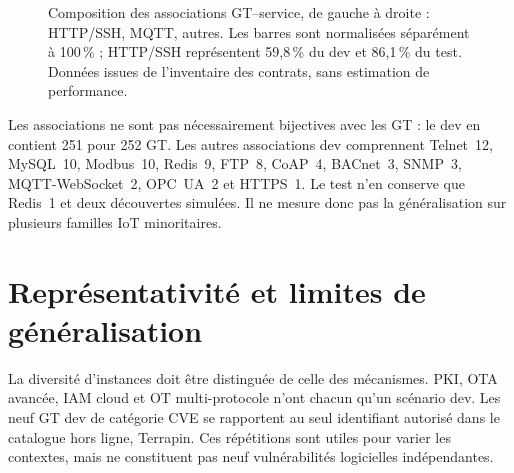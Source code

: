 \documentclass[11pt,a4paper]{article}
\begin{document}
\begin{figure}[htbp]
\centering
{}
\caption{Composition des associations GT--service, de gauche à droite : HTTP/SSH, MQTT, autres. Les barres sont normalisées séparément à 100\,\% ; HTTP/SSH représentent 59,8\,\% du dev et 86,1\,\% du test. Données issues de l'inventaire des contrats, sans estimation de performance.}
\label{fig:services}
\end{figure}

Les associations ne sont pas nécessairement bijectives avec les GT : le dev en contient 251 pour 252 GT. Les autres associations dev comprennent Telnet~12, MySQL~10, Modbus~10, Redis~9, FTP~8, CoAP~4, BACnet~3, SNMP~3, MQTT-WebSocket~2, OPC~UA~2 et HTTPS~1. Le test n'en conserve que Redis~1 et deux découvertes simulées. Il ne mesure donc pas la généralisation sur plusieurs familles IoT minoritaires.

\section{Représentativité et limites de généralisation}
\label{sec:representativity}
La diversité d'instances doit être distinguée de celle des mécanismes. PKI, OTA avancée, IAM cloud et OT multi-protocole n'ont chacun qu'un scénario dev. Les neuf GT dev de catégorie CVE se rapportent au seul identifiant autorisé dans le catalogue hors ligne, Terrapin. Ces répétitions sont utiles pour varier les contextes, mais ne constituent pas neuf vulnérabilités logicielles indépendantes.
\end{document}
